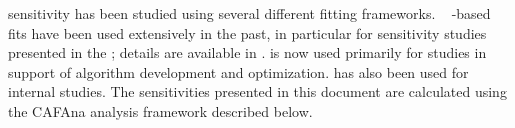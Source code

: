  sensitivity has been studied using several different fitting frameworks. ~\cite{Huber:2004ka,Huber:2007ji} %
-based fits have been used extensively in the past, in particular for sensitivity studies presented in the  ; details are available in \cite{Acciarri:2015uup,Alion:2016uaj,Bass:2014vta}.  is now used primarily for studies in support of algorithm development and optimization. \cite{valorweb} has also been used for internal studies.  The sensitivities presented in this document are calculated using the CAFAna analysis framework described below. %

